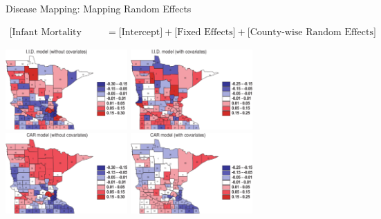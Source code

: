 \documentclass[10pt]{beamer}
\begin{document}
\begin{frame}{Disease Mapping: Mapping Random Effects}


{\tiny
\begin{align*}
 \mbox{[Infant Mortality Rates]} &= \mbox{[Intercept]} + \mbox{[Fixed Effects]} + \mbox{[County-wise Random Effects]}
\end{align*}
}

\vspace{-0.25in}
\begin{center}
\includegraphics[width=0.35\textwidth, height=0.35\textheight]{figs/BWC_IID_Without_Covariates}
\includegraphics[width=0.35\textwidth, height=0.35\textheight]{figs/BWC_IID_With_Covariates}\\
\vspace{0.15in}
\includegraphics[width=0.35\textwidth, height=0.35\textheight]{figs/BWC_CAR_Without_Covariates}
\includegraphics[width=0.35\textwidth, height=0.35\textheight]{figs/BWC_CAR_With_Covariates}
\end{center}

\end{frame}
\end{document}
